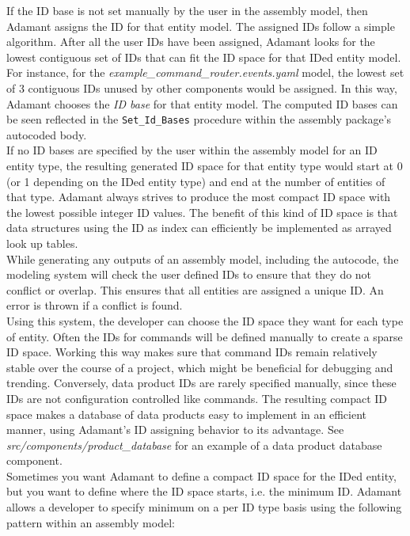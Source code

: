 If the ID base is not set manually by the user in the assembly model, then Adamant assigns the ID for that entity model. The assigned IDs follow a simple algorithm. After all the user IDs have been assigned, Adamant looks for the lowest contiguous set of IDs that can fit the ID space for that IDed entity model. For instance, for the \textit{example\_command\_router.events.yaml} model, the lowest set of 3 contiguous IDs unused by other components would be assigned. In this way, Adamant chooses the \textit{ID base} for that entity model. The computed ID bases can be seen reflected in the \texttt{Set\_Id\_Bases} procedure within the assembly package's autocoded body. \\

If no ID bases are specified by the user within the assembly model for an ID entity type, the resulting generated ID space for that entity type would start at 0 (or 1 depending on the IDed entity type) and end at the number of entities of that type. Adamant always strives to produce the most compact ID space with the lowest possible integer ID values. The benefit of this kind of ID space is that data structures using the ID as index can efficiently be implemented as arrayed look up tables. \\

While generating any outputs of an assembly model, including the autocode, the modeling system will check the user defined IDs to ensure that they do not conflict or overlap. This ensures that all entities are assigned a unique ID. An error is thrown if a conflict is found. \\

Using this system, the developer can choose the ID space they want for each type of entity. Often the IDs for commands will be defined manually to create a sparse ID space. Working this way makes sure that command IDs remain relatively stable over the course of a project, which might be beneficial for debugging and trending. Conversely, data product IDs are rarely specified manually, since these IDs are not configuration controlled like commands. The resulting compact ID space makes a database of data products easy to implement in an efficient manner, using Adamant's ID assigning behavior to its advantage. See \textit{src/components/product\_database} for an example of a data product database component. \\

Sometimes you want Adamant to define a compact ID space for the IDed entity, but you want to define where the ID space starts, i.e. the minimum ID. Adamant allows a developer to specify minimum on a per ID type basis using the following pattern within an assembly model: \\

